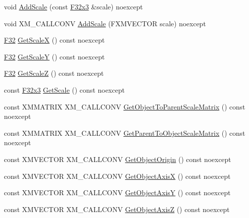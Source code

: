 \begin{DoxyCompactItemize}
\item 
void \hyperlink{classmage_1_1_transform_node_a925b13c7462275b9eb9645a74b6246e1}{Add\+Scale} (const \hyperlink{namespacemage_a73fbe0da4b8d5bc156bb8453e5b63a17}{F32x3} \&scale) noexcept
\item 
void X\+M\+\_\+\+C\+A\+L\+L\+C\+O\+NV \hyperlink{classmage_1_1_transform_node_ae8d3002804b23e5f8fcf4bd092869819}{Add\+Scale} (F\+X\+M\+V\+E\+C\+T\+OR scale) noexcept
\item 
\hyperlink{namespacemage_aa97e833b45f06d60a0a9c4fc22ae02c0}{F32} \hyperlink{classmage_1_1_transform_node_a7c3e1b4a002bff02c7c5b9d10346a006}{Get\+ScaleX} () const noexcept
\item 
\hyperlink{namespacemage_aa97e833b45f06d60a0a9c4fc22ae02c0}{F32} \hyperlink{classmage_1_1_transform_node_a30c5a1f0d549f3d082a04336831c2314}{Get\+ScaleY} () const noexcept
\item 
\hyperlink{namespacemage_aa97e833b45f06d60a0a9c4fc22ae02c0}{F32} \hyperlink{classmage_1_1_transform_node_adcfc199469861d9af4cd8d532645ac99}{Get\+ScaleZ} () const noexcept
\item 
const \hyperlink{namespacemage_a73fbe0da4b8d5bc156bb8453e5b63a17}{F32x3} \hyperlink{classmage_1_1_transform_node_ac786e3f763d98882b6ad35e43efe6898}{Get\+Scale} () const noexcept
\item 
const X\+M\+M\+A\+T\+R\+IX X\+M\+\_\+\+C\+A\+L\+L\+C\+O\+NV \hyperlink{classmage_1_1_transform_node_ad589a0a4b0d2d9645f4f912146d2c8b6}{Get\+Object\+To\+Parent\+Scale\+Matrix} () const noexcept
\item 
const X\+M\+M\+A\+T\+R\+IX X\+M\+\_\+\+C\+A\+L\+L\+C\+O\+NV \hyperlink{classmage_1_1_transform_node_a0cb65b5df44027b483ee82139c102382}{Get\+Parent\+To\+Object\+Scale\+Matrix} () const noexcept
\item 
const X\+M\+V\+E\+C\+T\+OR X\+M\+\_\+\+C\+A\+L\+L\+C\+O\+NV \hyperlink{classmage_1_1_transform_node_a339dbfb4d5895568988458aaaf6d0595}{Get\+Object\+Origin} () const noexcept
\item 
const X\+M\+V\+E\+C\+T\+OR X\+M\+\_\+\+C\+A\+L\+L\+C\+O\+NV \hyperlink{classmage_1_1_transform_node_aea5ced596f54f74d0d5308f2a14dd7cc}{Get\+Object\+AxisX} () const noexcept
\item 
const X\+M\+V\+E\+C\+T\+OR X\+M\+\_\+\+C\+A\+L\+L\+C\+O\+NV \hyperlink{classmage_1_1_transform_node_adb04c750404af13380ae5321874693f2}{Get\+Object\+AxisY} () const noexcept
\item 
const X\+M\+V\+E\+C\+T\+OR X\+M\+\_\+\+C\+A\+L\+L\+C\+O\+NV \hyperlink{classmage_1_1_transform_node_a0272f2c152c933f4b239cc9c818530c9}{Get\+Object\+AxisZ} () const noexcept

\end{DoxyCompactItemize}
